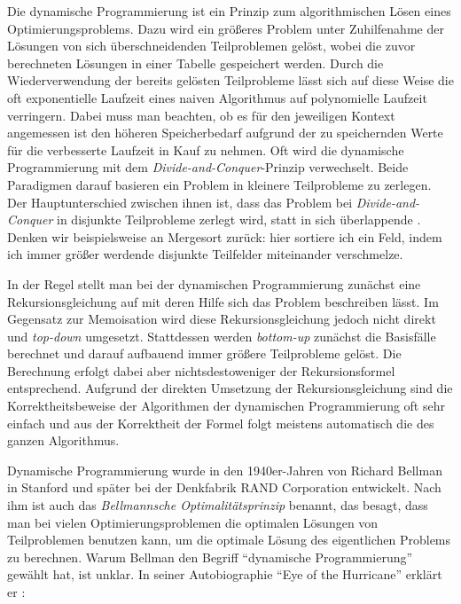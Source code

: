 Die dynamische Programmierung ist ein Prinzip zum algorithmischen Lösen eines Optimierungsproblems. Dazu wird ein größeres Problem unter Zuhilfenahme der Lösungen von sich überschneidenden Teilproblemen gelöst, wobei die zuvor berechneten Lösungen in einer Tabelle gespeichert werden. Durch die Wiederverwendung der bereits gelösten Teilprobleme lässt sich auf diese Weise die oft exponentielle Laufzeit eines naiven Algorithmus auf polynomielle Laufzeit verringern. Dabei muss man beachten, ob es für den jeweiligen Kontext angemessen ist den höheren Speicherbedarf aufgrund der zu speichernden Werte für die verbesserte Laufzeit in Kauf zu nehmen. Oft wird die dynamische Programmierung mit dem \emph{Divide-and-Conquer}-Prinzip verwechselt. Beide Paradigmen darauf basieren ein Problem in kleinere Teilprobleme zu zerlegen. Der Hauptunterschied zwischen ihnen ist, dass das Problem bei \emph{Divide-and-Conquer} in disjunkte Teilprobleme zerlegt wird, statt in sich überlappende \citep{clrs09}. Denken wir beispielsweise an Mergesort zurück: hier sortiere ich ein Feld, indem ich immer größer werdende disjunkte Teilfelder miteinander verschmelze.

In der Regel stellt man bei der dynamischen Programmierung zunächst eine Rekursionsgleichung auf mit deren Hilfe sich das Problem beschreiben lässt. Im Gegensatz zur Memoisation wird diese Rekursionsgleichung jedoch nicht direkt und \emph{top-down} umgesetzt. Stattdessen werden \emph{bottom-up} zunächst die Basisfälle berechnet und darauf aufbauend immer größere Teilprobleme gelöst. Die Berechnung erfolgt dabei aber nichtsdestoweniger der Rekursionsformel entsprechend. Aufgrund der direkten Umsetzung der Rekursionsgleichung sind die Korrektheitsbeweise der Algorithmen der dynamischen Programmierung oft sehr einfach und aus der Korrektheit der Formel folgt meistens automatisch die des ganzen Algorithmus.

Dynamische Programmierung wurde in den 1940er-Jahren von Richard Bellman in Stanford und später bei der Denkfabrik RAND Corporation entwickelt. Nach ihm ist auch das \emph{Bellmannsche Optimalitätsprinzip} benannt, das besagt, dass man bei vielen Optimierungsproblemen die optimalen Lösungen von Teilproblemen benutzen kann, um die optimale Lösung des eigentlichen Problems zu berechnen. Warum Bellman den Begriff \enquote{dynamische Programmierung} gewählt hat, ist unklar. In seiner Autobiographie \enquote{Eye of the Hurricane} erklärt er \citep{b84}:

